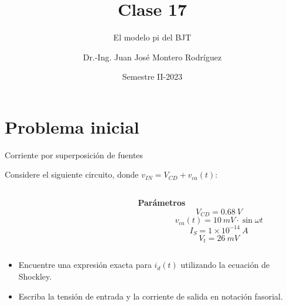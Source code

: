 \documentclass[t,aspectratio=169]{beamer}
\title{Clase 17}
\subtitle{El modelo pi del BJT}
\author{Dr.-Ing. Juan José Montero Rodríguez}
\institute{Escuela de Ingeniería Electrónica}
\date{Semestre II-2023}
\begin{document}
\begin{frame}{}
\maketitle
\end{frame}

\section{Problema inicial}
\begin{frame}{Corriente por superposición de fuentes}

Considere el siguiente circuito, donde $v_{IN} = V_{CD} + v_{ca}(t)$:

\begin{columns}
\begin{column}{0.5\textwidth}

\begin{figure}[H]
    \centering
\end{figure}

\end{column}
\begin{column}{0.5\textwidth}

\centering
\textbf{Parámetros}
\[ V_{CD} = 0.68\ V \]
\[ v_{ca}(t) = 10\ mV \cdot \sin \omega t \]
\[ I_S = 1 \times 10^{-14}\ A \]
\[ V_t = 26\ mV \]

\end{column}
\end{columns}

\vspace{5mm}
\begin{itemize}
    \item Encuentre una expresión exacta para $i_d(t)$ utilizando la ecuación de Shockley.
    \item Escriba la tensión de entrada y la corriente de salida en notación fasorial.
\end{itemize}

\end{frame}
\end{document}
